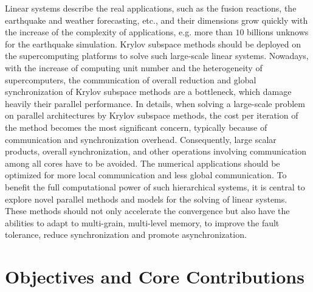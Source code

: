 Linear systems describe the real applications, such as the fusion reactions, the earthquake and weather forecasting, etc., and their dimensions grow quickly with the increase of the complexity of applications, e.g. more than $10$ billions unknows for the earthquake simulation. Krylov subspace methods should be deployed on the supercomputing platforms to solve such large-scale linear systems. Nowadays, with the increase of computing unit number and the heterogeneity of supercomputers, the communication of overall reduction and global synchronization of Krylov subspace methods are a bottleneck, which damage heavily their parallel performance. In details, when solving a large-scale problem on parallel architectures by Krylov subspace methods, the cost per iteration of the method becomes the most significant concern, typically because of communication and synchronization overhead. Consequently, large scalar products, overall synchronization, and other operations involving communication among all cores have to be avoided. The numerical applications should be optimized for more local communication and less global communication. To benefit the full computational power of such hierarchical systems, it is central to explore novel parallel methods and models for the solving of linear systems. These methods should not only accelerate the convergence but also have the abilities to adapt to multi-grain, multi-level memory, to improve the fault tolerance, reduce synchronization and promote asynchronization.

\section{Objectives and Core Contributions}

